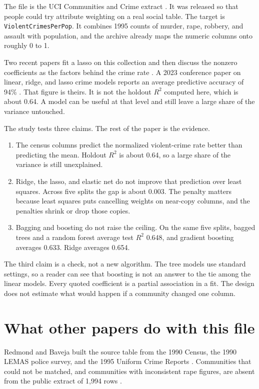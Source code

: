 \documentclass[conference]{IEEEtran}
\begin{document}
The file is the UCI Communities and Crime extract \cite{redmond2002,uci2009}.
It was released so that people could try attribute weighting on a real social table.
The target is \texttt{ViolentCrimesPerPop}.
It combines 1995 counts of murder, rape, robbery, and assault with population, and the archive already maps the numeric columns onto roughly 0 to 1.

Two recent papers fit a lasso on this collection and then discuss the nonzero coefficients as the factors behind the crime rate \cite{dai2024,wei2025}.
A 2023 conference paper on linear, ridge, and lasso crime models reports an average predictive accuracy of 94\% \cite{david2023}.
That figure is theirs.
It is not the holdout $R^{2}$ computed here, which is about 0.64.
A model can be useful at that level and still leave a large share of the variance untouched.

The study tests three claims. The rest of the paper is the evidence.
\begin{enumerate}
\item The census columns predict the normalized violent-crime rate better than predicting the mean. Holdout $R^{2}$ is about 0.64, so a large share of the variance is still unexplained.
\item Ridge, the lasso, and elastic net do not improve that prediction over least squares. Across five splits the gap is about 0.003. The penalty matters because least squares puts cancelling weights on near-copy columns, and the penalties shrink or drop those copies.
\item Bagging and boosting do not raise the ceiling. On the same five splits, bagged trees and a random forest average test $R^{2}$ 0.648, and gradient boosting averages 0.633. Ridge averages 0.654.
\end{enumerate}
The third claim is a check, not a new algorithm.
The tree models use standard settings, so a reader can see that boosting is not an answer to the tie among the linear models.
Every quoted coefficient is a partial association in a fit.
The design does not estimate what would happen if a community changed one column.

\section{What other papers do with this file}
Redmond and Baveja built the source table from the 1990 Census, the 1990 LEMAS police survey, and the 1995 Uniform Crime Reports \cite{redmond2002}.
Communities that could not be matched, and communities with inconsistent rape figures, are absent from the public extract of 1{,}994 rows \cite{uci2009}.
\end{document}
